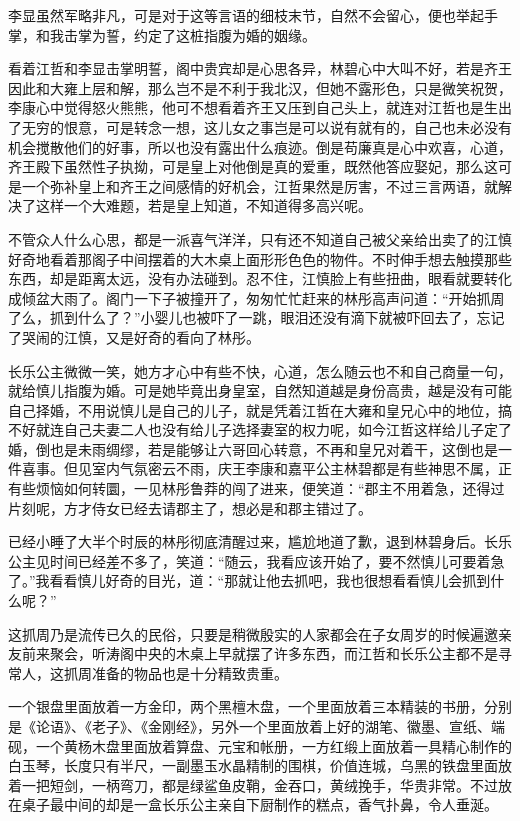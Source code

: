 李显虽然军略非凡，可是对于这等言语的细枝末节，自然不会留心，便也举起手掌，和我击掌为誓，约定了这桩指腹为婚的姻缘。

看着江哲和李显击掌明誓，阁中贵宾却是心思各异，林碧心中大叫不好，若是齐王因此和大雍上层和解，那么岂不是不利于我北汉，但她不露形色，只是微笑祝贺，李康心中觉得怒火熊熊，他可不想看着齐王又压到自己头上，就连对江哲也是生出了无穷的恨意，可是转念一想，这儿女之事岂是可以说有就有的，自己也未必没有机会搅散他们的好事，所以也没有露出什么痕迹。倒是苟廉真是心中欢喜，心道，齐王殿下虽然性子执拗，可是皇上对他倒是真的爱重，既然他答应娶妃，那么这可是一个弥补皇上和齐王之间感情的好机会，江哲果然是厉害，不过三言两语，就解决了这样一个大难题，若是皇上知道，不知道得多高兴呢。

不管众人什么心思，都是一派喜气洋洋，只有还不知道自己被父亲给出卖了的江慎好奇地看着那阁子中间摆着的大木桌上面形形色色的物件。不时伸手想去触摸那些东西，却是距离太远，没有办法碰到。忍不住，江慎脸上有些扭曲，眼看就要转化成倾盆大雨了。阁门一下子被撞开了，匆匆忙忙赶来的林彤高声问道：“开始抓周了么，抓到什么了？”小婴儿也被吓了一跳，眼泪还没有滴下就被吓回去了，忘记了哭闹的江慎，又是好奇的看向了林彤。

长乐公主微微一笑，她方才心中有些不快，心道，怎么随云也不和自己商量一句，就给慎儿指腹为婚。可是她毕竟出身皇室，自然知道越是身份高贵，越是没有可能自己择婚，不用说慎儿是自己的儿子，就是凭着江哲在大雍和皇兄心中的地位，搞不好就连自己夫妻二人也没有给儿子选择妻室的权力呢，如今江哲这样给儿子定了婚，倒也是未雨绸缪，若是能够让六哥回心转意，不再和皇兄对着干，这倒也是一件喜事。但见室内气氛密云不雨，庆王李康和嘉平公主林碧都是有些神思不属，正有些烦恼如何转圜，一见林彤鲁莽的闯了进来，便笑道：“郡主不用着急，还得过片刻呢，方才侍女已经去请郡主了，想必是和郡主错过了。

已经小睡了大半个时辰的林彤彻底清醒过来，尴尬地道了歉，退到林碧身后。长乐公主见时间已经差不多了，笑道：“随云，我看应该开始了，要不然慎儿可要着急了。”我看看慎儿好奇的目光，道：“那就让他去抓吧，我也很想看看慎儿会抓到什么呢？”

这抓周乃是流传已久的民俗，只要是稍微殷实的人家都会在子女周岁的时候遍邀亲友前来聚会，听涛阁中央的木桌上早就摆了许多东西，而江哲和长乐公主都不是寻常人，这抓周准备的物品也是十分精致贵重。

一个银盘里面放着一方金印，两个黑檀木盘，一个里面放着三本精装的书册，分别是《论语》、《老子》、《金刚经》，另外一个里面放着上好的湖笔、徽墨、宣纸、端砚，一个黄杨木盘里面放着算盘、元宝和帐册，一方红缎上面放着一具精心制作的白玉琴，长度只有半尺，一副墨玉水晶精制的围棋，价值连城，乌黑的铁盘里面放着一把短剑，一柄弯刀，都是绿鲨鱼皮鞘，金吞口，黄绒挽手，华贵非常。不过放在桌子最中间的却是一盒长乐公主亲自下厨制作的糕点，香气扑鼻，令人垂涎。

